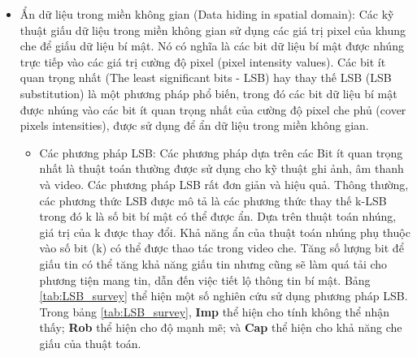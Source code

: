 \begin{itemize}
    \item Ẩn dữ liệu trong miền không gian (Data hiding in spatial domain):
    Các kỹ thuật giấu dữ liệu trong miền không gian sử dụng các giá trị pixel của khung che để giấu dữ liệu bí mật. Nó có nghĩa là các bit dữ liệu bí mật được nhúng trực tiếp vào các giá trị cường độ pixel (pixel intensity values). Các bit ít quan trọng nhất (The least significant bits - LSB) hay  thay thế LSB (LSB substitution) là một phương pháp phổ biến, trong đó các bit dữ liệu bí mật được nhúng vào các bit ít quan trọng nhất của cường độ pixel che phủ (cover pixels intensities), được sử dụng để ẩn dữ liệu trong miền không gian. 
    \begin{itemize}
        \item Các phương pháp LSB:     
Các phương pháp dựa trên các Bit ít quan trọng nhất là thuật toán thường được sử dụng cho kỹ thuật ghi ảnh, âm thanh và video. Các phương pháp LSB rất đơn giản và hiệu quả. Thông thường, các phương thức LSB được mô tả là các phương thức thay thế k-LSB trong đó k là số bit bí mật có thể được ẩn. Dựa trên thuật toán nhúng, giá trị của k được thay đổi. Khả năng ẩn của thuật toán nhúng phụ thuộc vào số bit (k) có thể được thao tác trong video che. Tăng số lượng bit để giấu tin có thể tăng khả năng giấu tin nhưng cũng sẽ làm quá tải cho phương tiện mang tin, dẫn đến việc tiết lộ thông tin bí mật. Bảng \ref{tab:LSB_survey} thể hiện một số nghiên cứu sử dụng phương pháp LSB. Trong bảng \ref{tab:LSB_survey}, \textbf{Imp} thể hiện cho tính không thể nhận thấy; \textbf{Rob} thể hiện cho độ mạnh mẽ; và \textbf{Cap} thể hiện cho khả năng che giấu của thuật toán.


\end{itemize}
\end{itemize}
